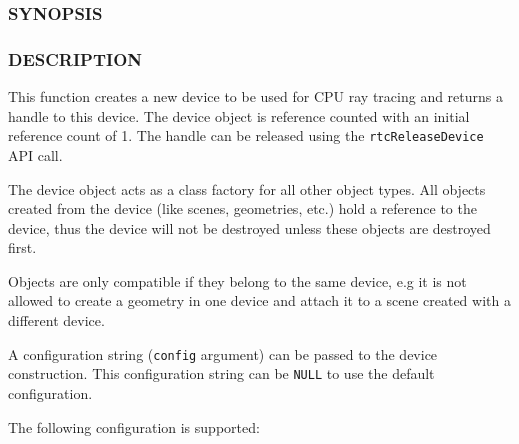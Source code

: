 \begin{Shaded}
\begin{Highlighting}[]
\OperatorTok{{-}}
\end{Highlighting}
\end{Shaded}

\subsubsection{SYNOPSIS}\label{synopsis}

\begin{Shaded}
\begin{Highlighting}[]

\OperatorTok{(} \OperatorTok{*}\OperatorTok{);}
\end{Highlighting}
\end{Shaded}

\subsubsection{DESCRIPTION}\label{description}

This function creates a new device to be used for CPU ray tracing and
returns a handle to this device. The device object is reference counted
with an initial reference count of 1. The handle can be released using
the \texttt{rtcReleaseDevice} API call.

The device object acts as a class factory for all other object types.
All objects created from the device (like scenes, geometries, etc.) hold
a reference to the device, thus the device will not be destroyed unless
these objects are destroyed first.

Objects are only compatible if they belong to the same device, e.g it is
not allowed to create a geometry in one device and attach it to a scene
created with a different device.

A configuration string (\texttt{config} argument) can be passed to the
device construction. This configuration string can be \texttt{NULL} to
use the default configuration.

The following configuration is supported:

